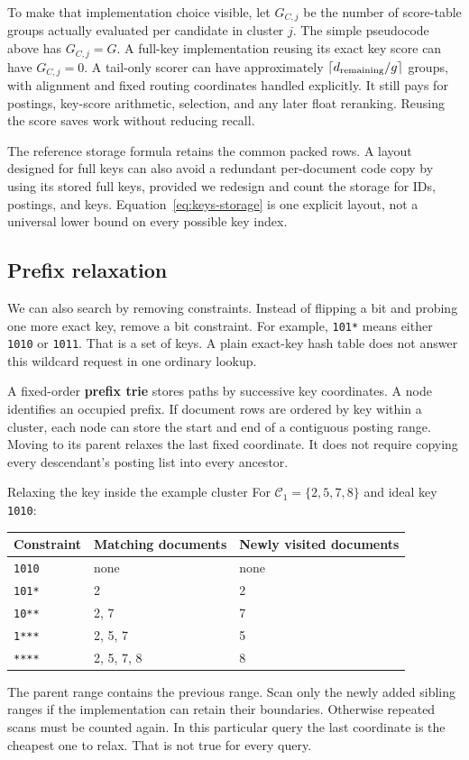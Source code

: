 To make that implementation choice visible, let $G_{C,j}$ be the number of score-table groups
actually evaluated per candidate in cluster $j$. The simple pseudocode above has $G_{C,j}=G$.
A full-key implementation reusing its exact key score can have $G_{C,j}=0$. A tail-only scorer
can have approximately $\left\lceil d_{\rm remaining}/g\right\rceil$ groups, with alignment and fixed routing
coordinates handled explicitly. It still pays for postings, key-score arithmetic, selection,
and any later float reranking. Reusing the score saves work without reducing recall.

The reference storage formula retains the common packed rows. A layout designed for full keys
can also avoid a redundant per-document code copy by using its stored full keys, provided we
redesign and count the storage for IDs, postings, and keys. Equation~\eqref{eq:keys-storage} is
one explicit layout, not a universal lower bound on every possible key index.

\subsection{Prefix relaxation}
We can also search by removing constraints. Instead of flipping a bit and probing
one more exact key, remove a bit constraint. For example, \texttt{101*} means either
\texttt{1010} or \texttt{1011}. That is a set of keys. A plain exact-key hash table does not
answer this wildcard request in one ordinary lookup.

A fixed-order \textbf{prefix trie} stores paths by successive key coordinates. A node identifies
an occupied prefix. If document rows are ordered by key within a cluster, each node can store
the start and end of a contiguous posting range. Moving to its parent relaxes the last fixed
coordinate. It does not require copying every descendant's posting list into every ancestor.

\begin{examplebox}{Relaxing the key inside the example cluster}
For $\mathcal C_1=\{2,5,7,8\}$ and ideal key \texttt{1010}:
\begin{center}
\begin{tabular}{@{}lll@{}}\toprule
Constraint & Matching documents & Newly visited documents\\\midrule
\texttt{1010} & none & none\\
\texttt{101*} & 2 & 2\\
\texttt{10**} & 2, 7 & 7\\
\texttt{1***} & 2, 5, 7 & 5\\
\texttt{****} & 2, 5, 7, 8 & 8\\\bottomrule
\end{tabular}
\end{center}
The parent range contains the previous range. Scan only the newly added sibling ranges if the
implementation can retain their boundaries. Otherwise repeated scans must be counted again.
In this particular query the last coordinate is the cheapest one to relax. That is not true
for every query.
\end{examplebox}

